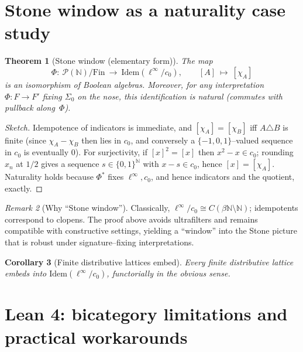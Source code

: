 \documentclass[11pt]{article}
\newtheorem{theorem}{Theorem}[section]
\newtheorem{corollary}[theorem]{Corollary}
\theoremstyle{definition}
\theoremstyle{remark}
\newtheorem{remark}[theorem]{Remark}
\newcommand{\N}{\mathbb{N}}
\newcommand{\cnull}{c_0}
\newcommand{\linf}{\ell^\infty}
\newcommand{\SigmaZero}{\Sigma_{0}}
\begin{document}
\section{Stone window as a naturality case study}\label{sec:stone}

\begin{theorem}[Stone window (elementary form)]\label{thm:stone}
The map
\[
  \Phi:\ \mathcal{P}(\N)/\mathrm{Fin} \ \longrightarrow\ \mathrm{Idem}(\linf/\cnull),\qquad
  [A]\ \longmapsto\ [\chi_A]
\]
is an isomorphism of Boolean algebras. Moreover, for any interpretation \(\Phi:F\to F'\) fixing \(\SigmaZero\) on the nose, this identification is natural (commutes with pullback along~\(\Phi\)).
\end{theorem}

\begin{proof}[Sketch]
Idempotence of indicators is immediate, and \([\chi_A]=[\chi_B]\) iff \(A\triangle B\) is finite (since \(\chi_A-\chi_B\) then lies in \(\cnull\), and conversely a $\{-1,0,1\}$--valued sequence in \(\cnull\) is eventually $0$). For surjectivity, if \([x]^2=[x]\) then \(x^2-x\in\cnull\); rounding $x_n$ at \(1/2\) gives a sequence \(s\in\{0,1\}^\N\) with \(x-s\in\cnull\), hence \([x]=[\chi_A]\). Naturality holds because \(\Phi^*\) fixes \(\linf,\cnull\), and hence indicators and the quotient, exactly.
\end{proof}

\begin{remark}[Why ``Stone window'']
Classically, \(\linf/\cnull\cong C(\beta\N\setminus\N)\); idempotents correspond to clopens. The proof above avoids ultrafilters and remains compatible with constructive settings, yielding a ``window'' into the Stone picture that is robust under signature--fixing interpretations.
\end{remark}

\begin{corollary}[Finite distributive lattices embed]
Every finite distributive lattice embeds into \(\mathrm{Idem}(\linf/\cnull)\), functorially in the obvious sense. 
\end{corollary}

\section{Lean 4: bicategory limitations and practical workarounds}\label{sec:lean}
\end{document}
